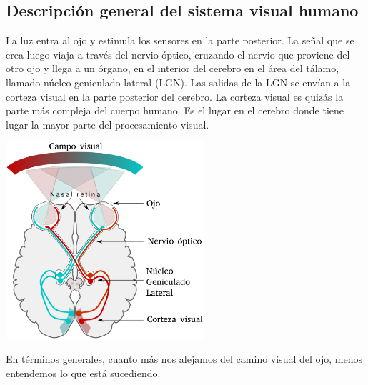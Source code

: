 \subsection{Descripción general del sistema visual humano}
La luz entra al ojo y estimula los sensores en la parte posterior.
La señal que se crea luego viaja a través del nervio óptico, cruzando el
nervio que proviene del otro ojo y llega a un órgano, en el interior del
cerebro en el área del tálamo, llamado núcleo geniculado lateral (LGN).
Las salidas de la LGN se envían a la corteza visual en la parte posterior del cerebro.
La corteza visual es quizás la parte más compleja del cuerpo humano. Es el lugar en el
cerebro donde tiene lugar la mayor parte del procesamiento visual.~\cite{anilbharath2008}
\begin{center}
    \includegraphics[width=0.55\textwidth]{Capitulo2/Fig1_1.eps}
    \label{Fig1_1}
\end{center}
En términos generales, cuanto más nos alejamos del camino visual del ojo, menos
entendemos lo que está sucediendo.

